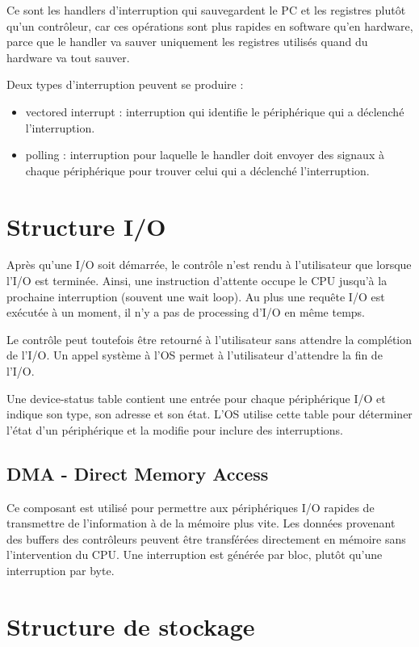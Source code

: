 		Ce sont les handlers d'interruption qui sauvegardent le PC et les registres plutôt qu'un contrôleur, car ces opérations sont plus rapides en software qu'en hardware, parce que le handler va sauver uniquement les registres utilisés quand du hardware va tout sauver.
		
	Deux types d'interruption peuvent se produire :
	
	\begin{itemize}
		\item vectored interrupt : interruption qui identifie le périphérique qui a déclenché l'interruption.
		\item polling : interruption pour laquelle le handler doit envoyer des signaux à chaque périphérique pour trouver celui qui a déclenché l'interruption.
	\end{itemize}
	
	\section{Structure I/O}
	
	Après qu'une I/O soit démarrée, le contrôle n'est rendu à l'utilisateur que lorsque l'I/O est terminée. Ainsi, une instruction d'attente occupe le CPU jusqu'à la prochaine interruption (souvent une wait loop). Au plus une requête I/O est exécutée à un moment, il n'y a pas de processing d'I/O en même temps.
	
	Le contrôle peut toutefois être retourné à l'utilisateur sans attendre la complétion de l'I/O. Un appel système à l'OS permet à l'utilisateur d'attendre la fin de l'I/O.
	
	Une device-status table contient une entrée pour chaque périphérique I/O et indique son type, son adresse et son état. L'OS utilise cette table pour déterminer l'état d'un périphérique et la modifie pour inclure des interruptions.
	
		\subsection{DMA - Direct Memory Access}
		
		Ce composant est utilisé pour permettre aux périphériques I/O rapides de transmettre de l'information à de la mémoire plus vite. Les données provenant des buffers des contrôleurs peuvent être transférées directement en mémoire sans l'intervention du CPU. Une interruption est générée par bloc, plutôt qu'une interruption par byte.
		
	\section{Structure de stockage}
	
